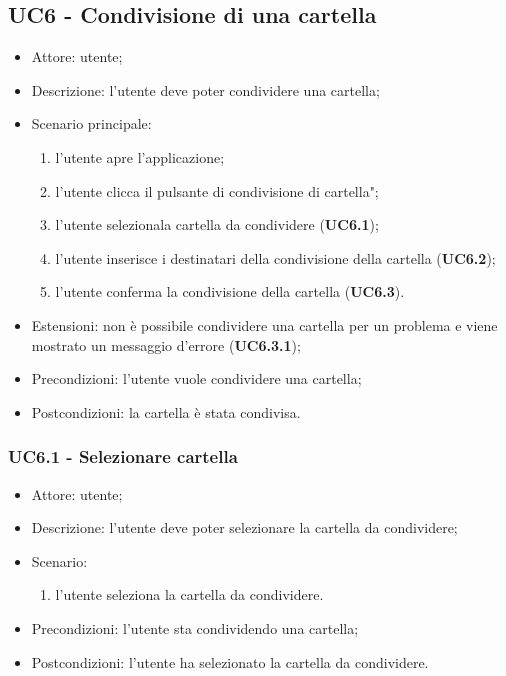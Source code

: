     \subsection{UC6 - Condivisione di una cartella}
    \begin{itemize}
        \item Attore: utente;
        \item Descrizione: l'utente deve poter condividere una cartella;
        \item Scenario principale:
            \begin{enumerate}
            \item l’utente apre l’applicazione;
            \item l’utente clicca il pulsante di condivisione di cartella";
            \item l'utente selezionala cartella da condividere (\textbf{UC6.1});
            \item l'utente inserisce i destinatari della condivisione della cartella (\textbf{UC6.2});   
            \item l'utente conferma la condivisione della cartella (\textbf{UC6.3}).          
            \end{enumerate}
        \item Estensioni: non è possibile condividere una cartella per un problema e viene mostrato un messaggio d'errore (\textbf{UC6.3.1});
        \item Precondizioni: l'utente vuole condividere una cartella;
        \item Postcondizioni: la cartella è stata condivisa.
    \end{itemize}

    \subsubsection{UC6.1 - Selezionare cartella}
    \begin{itemize}
        \item Attore: utente;
        \item Descrizione: l'utente deve poter selezionare la cartella da condividere;
        \item Scenario:
        \begin{enumerate}
        \item l'utente seleziona la cartella da condividere.
        \end{enumerate}
        \item Precondizioni: l'utente sta condividendo una cartella;
        \item Postcondizioni: l'utente ha selezionato la cartella da condividere.
    \end{itemize}
